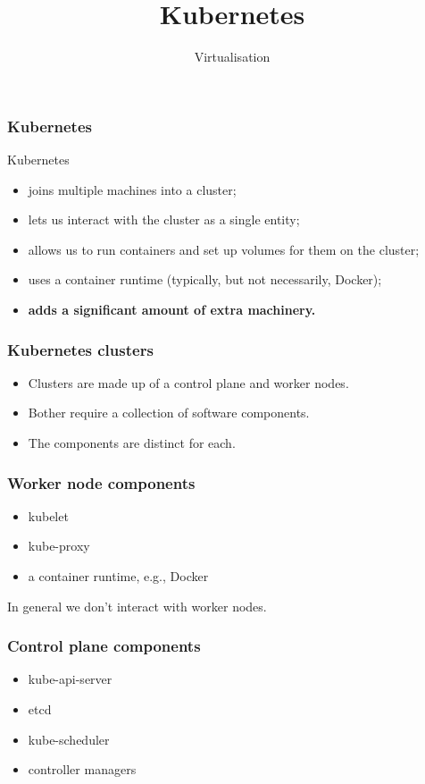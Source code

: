 \documentclass[10pt]{beamer}
\title{Kubernetes}
\author[ID720]{Virtualisation}
\institute[Otago Polytechnic]{
  Otago Polytechnic \\
  Dunedin, New Zealand \\
}
\date{}
\begin{document}
\begin{frame}[plain]
  \titlepage
\end{frame}



\begin{frame}
  \frametitle{Kubernetes}
  Kubernetes 
  \begin{itemize}
    \item joins multiple machines into a cluster;
    \item lets us interact with the cluster as a single entity;
    \item allows us to run containers and set up volumes for them on the cluster;
    \item uses a container runtime (typically, but not necessarily, Docker);
    \item \textbf{adds a significant amount of extra machinery.}
  \end{itemize}
\end{frame}

\begin{frame}
  \frametitle{Kubernetes clusters}
  
  \begin{itemize}
    \item Clusters are made up of a control plane and worker nodes.
    \item Bother require a collection of software components.
    \item The components are distinct for each.
  \end{itemize}
\end{frame}

\begin{frame}
  \frametitle{Worker node components}
  
  \begin{itemize}
    \item kubelet
    \item kube-proxy
    \item a container runtime, e.g., Docker
  \end{itemize}
  
  In general we don't interact with worker nodes.
\end{frame}

\begin{frame}
  \frametitle{Control plane components}
  
  \begin{itemize}
    \item kube-api-server
    \item etcd
    \item kube-scheduler
    \item controller managers
  \end{itemize}
  
\end{frame}
\end{document}

